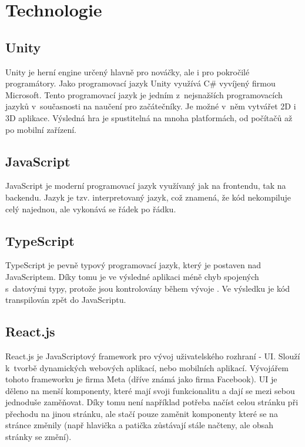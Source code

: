 \section{Technologie}

\subsection{Unity}
Unity je herní engine určený hlavně pro nováčky, ale i pro pokročilé programátory. Jako programovací jazyk Unity využívá C\# vyvíjený firmou Microsoft. Tento programovací jazyk je jedním z~nejsnažších programovacích jazyků v~současnosti na naučení pro začátečníky. \cite{Csharp} Je možné v~něm vytvářet 2D i 3D aplikace. Výsledná hra je spustitelná na mnoha platformách, od počítačů až po mobilní zařízení.

\subsection{JavaScript}
JavaScript je moderní programovací jazyk využívaný jak na frontendu, tak na backendu. Jazyk je tzv. interpretovaný jazyk, což znamená, že kód nekompiluje celý najednou, ale vykonává se řádek po řádku.

\subsection{TypeScript}
TypeScript je pevně typový programovací jazyk, který je postaven nad JavaScriptem. \cite{TypeScript} Díky tomu je ve výsledné aplikaci méně chyb spojených s~datovými typy, protože jsou kontrolovány během vývoje \cite{TypeScript}. Ve výsledku je kód transpilován zpět do JavaScriptu.

\subsection{React.js}
React.js je JavaScriptový framework pro vývoj uživatelského rozhraní - UI. Slouží k~tvorbě dynamických webových aplikací, nebo mobilních aplikací. Vývojářem tohoto frameworku je firma Meta (dříve známá jako firma Facebook). UI je děleno na menší komponenty, které mají svoji funkcionalitu a dají se mezi sebou jednoduše zaměňovat. Díky tomu není například potřeba načíst celou stránku při přechodu na jinou stránku, ale stačí pouze zaměnit komponenty které se na stránce změnily (např hlavička a patička zůstávají stále načteny, ale obsah stránky se změní).

